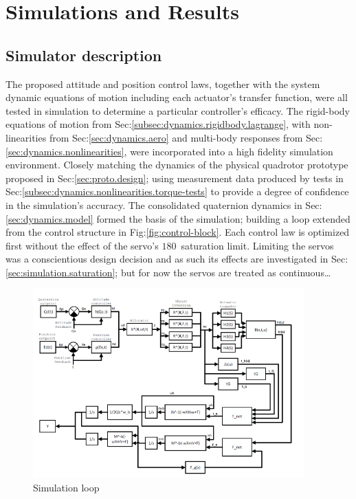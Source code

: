 \chapter{Simulations and Results}
\label{ch:simulation}
\section{Simulator description}
\label{sec:simulation.block}
The proposed attitude and position control laws, together with the system dynamic equations of motion including each actuator's transfer function, were all tested in simulation to determine a particular controller's efficacy. The rigid-body equations of motion from Sec:\ref{subsec:dynamics.rigidbody.lagrange}, with non-linearities from Sec:\ref{sec:dynamics.aero} and multi-body responses from Sec:\ref{sec:dynamics.nonlinearities}, were incorporated into a high fidelity simulation environment. Closely matching the dynamics of the physical quadrotor prototype proposed in Sec:\ref{sec:proto.design}; using measurement data produced by tests in Sec:\ref{subsec:dynamics.nonlinearities.torque-tests} to provide a degree of confidence in the simulation's accuracy. The consolidated quaternion dynamics in Sec:\ref{sec:dynamics.model} formed the basis of the simulation; building a loop extended from the control structure in Fig:\ref{fig:control-block}. Each control law is optimized first without the effect of the servo's $180$\textdegree ~saturation limit. Limiting the servos was a conscientious design decision and as such its effects are investigated in Sec:\ref{sec:simulation.saturation}; but for now the servos are treated as continuous\ldots
\par
\begin{figure}[htbp]
\vspace{-10pt}
\centering
\includegraphics[width=0.93\textwidth]{figs/simulation-block}
\vspace{-10pt}
\caption{Simulation loop}
\label{fig:simulation-block}
\end{figure}
